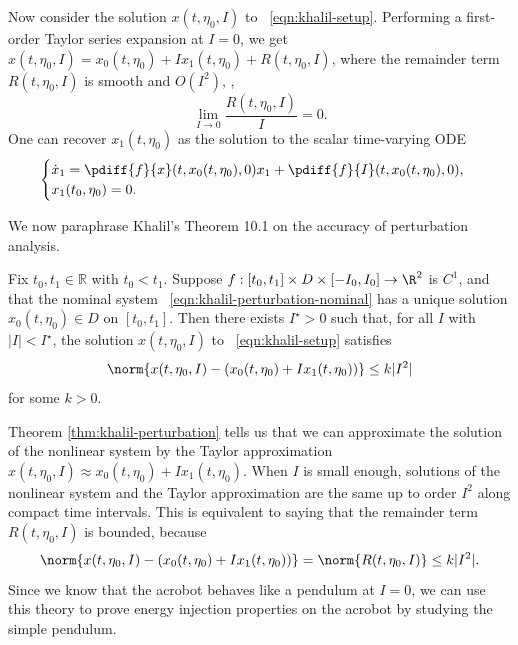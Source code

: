 Now consider the solution \(x(t,\eta_0,I)\) to ~\eqref{eqn:khalil-setup}.
Performing a first-order Taylor series expansion at \(I = 0\), we get
\(x(t,\eta_0,I) = x_0(t,\eta_0) + I x_1(t,\eta_0) + R(t,\eta_0,I)\),
where the remainder term \(R(t,\eta_0,I)\) is smooth and \(O(I^2)\), \ie, 
\[
    \lim \limits_{I \to 0} \frac{R(t,\eta_0,I)}{I} = 0
    .
\]
One can recover \(x_1(t,\eta_0)\) as the solution to the scalar
time-varying ODE
\begin{equation}\label{eqn:khalil-perturbation-firstorder}
    \begin{cases}
        \dot{x}_1 = \pdiff{f}{x}(t,x_0(t,\eta_0),0)x_1 + \pdiff{f}{I}(t,x_0(t,\eta_0),0)
        , \\
        x_1(t_0,\eta_0) = 0
        .
    \end{cases}
\end{equation}

We now paraphrase Khalil's Theorem 10.1 \cite{khalil_nonlinear} on the
accuracy of perturbation analysis.
\begin{thm}\label{thm:khalil-perturbation}
    Fix \(t_0, t_1 \in \mathbb{R}\) with \(t_0 < t_1\).
    Suppose \(f : [t_0,t_1] \times D \times [-I_0,I_0] \rightarrow \R^2\) is
    \(C^1\), and that the nominal system
    ~\eqref{eqn:khalil-perturbation-nominal} has a unique solution
    \(x_0(t,\eta_0) \in D\) on \([t_0,t_1]\).
    Then there exists \(I^\star > 0\) such that, for all \(I\) with 
    \(|I| < I^\star\), the solution \(x(t,\eta_0,I)\) to
    ~\eqref{eqn:khalil-setup} satisfies
    \[
        \norm{x(t,\eta_0,I) - \left(x_0(t,\eta_0) + I x_1(t,\eta_0)\right)} \leq k |I^2|
    \]
    for some \(k > 0\).
\end{thm}

Theorem \ref{thm:khalil-perturbation} tells us that we can approximate the
solution of the nonlinear system by the Taylor approximation 
\(x(t,\eta_0,I) \approx x_0(t,\eta_0) + I x_1(t,\eta_0)\).
When \(I\) is small enough, solutions of the nonlinear system and
the Taylor approximation are the same up to order \(I^2\) along compact time
intervals.
This is equivalent to saying that the remainder term \(R(t,\eta_0,I)\) is
bounded, because 
\[
    \norm{x(t,\eta_0,I) - \left(x_0(t,\eta_0) + I x_1(t,\eta_0)\right)} 
    = \norm{R(t,\eta_0,I)} \leq k |I^2|
    .
\]
Since we know that the acrobot behaves like a pendulum at \(I = 0\), we can
use this theory to prove energy injection properties on the acrobot by studying
the simple pendulum.
 

